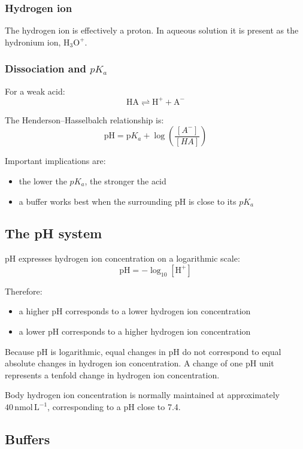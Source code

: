\documentclass[11pt,a4paper]{article}
\begin{document}
\subsubsection{Hydrogen ion}

The hydrogen ion is effectively a proton. In aqueous solution it is present as the hydronium ion, \( \mathrm{H_3O^+} \).

\subsubsection{Dissociation and \(pK_a\)}

For a weak acid:
\[
\mathrm{HA \rightleftharpoons H^+ + A^-}
\]

The Henderson--Hasselbalch relationship is:
\[
\mathrm{pH = p}K_a + \log \left( \frac{[A^-]}{[HA]} \right)
\]

Important implications are:

\begin{itemize}
    \item the lower the \(pK_a\), the stronger the acid
    \item a buffer works best when the surrounding pH is close to its \(pK_a\)
\end{itemize}

\subsection{The pH system}

pH expresses hydrogen ion concentration on a logarithmic scale:
\[
\mathrm{pH = -\log_{10}[H^+]}
\]

Therefore:

\begin{itemize}
    \item a higher pH corresponds to a lower hydrogen ion concentration
    \item a lower pH corresponds to a higher hydrogen ion concentration
\end{itemize}

Because pH is logarithmic, equal changes in pH do not correspond to equal absolute changes in hydrogen ion concentration. A change of one pH unit represents a tenfold change in hydrogen ion concentration.

Body hydrogen ion concentration is normally maintained at approximately \(40\,\mathrm{nmol\,L^{-1}}\), corresponding to a pH close to 7.4.

\subsection{Buffers}
\end{document}

